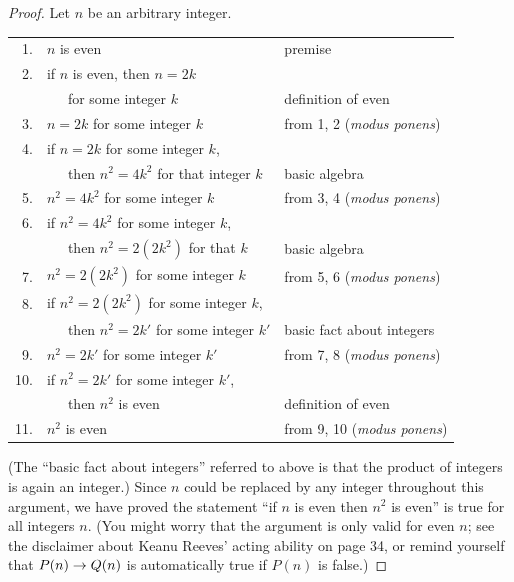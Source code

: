 \begin{proof}
Let $n$ 
be an arbitrary integer.
\begin{center}
\begin{tabular}{r@{\ \ }l@{\qquad}l}
1.&$n$ is even                                      &  premise\\
2.&if $n$ is even, then $n=2k$                      & \\
  & \ \ \ for some integer $k$                      & definition of even \\
3.&$n=2k$ for some integer $k$                      & from 1, 2 (\textit{modus ponens})\\
4.&if $n=2k$ for some integer $k$,                  & \\
  & \ \ \  then $n^2=4k^2$ for that integer $k$     & basic algebra\\
5.&$n^2 = 4k^2$ for some integer $k$                & from 3, 4 (\textit{modus ponens})\\
6.&if $n^2=4k^2$ for some integer $k$,              & \\
  & \ \ \  then $n^2=2(2k^2)$ for that $k$          & basic algebra\\
7.&$n^2=2(2k^2)$ for some integer $k$               & from 5, 6 (\textit{modus ponens})\\
8.&if $n^2 = 2(2k^2)$ for some integer $k$,         & \\
  & \ \ \  then $n^2 = 2k'$ for some integer $k'$   & basic fact about integers\\
9.&$n^2 = 2k'$ for some integer $k'$                & from 7, 8 (\textit{modus ponens})\\
10.&if $n^2 = 2k'$ for some integer $k'$,           & \\
  & \ \ \ then $n^2$ is even                        & definition of even\\
11.&$n^2$ is even                                   & from 9, 10 (\textit{modus ponens})\\
\end{tabular}
\end{center}
(The ``basic fact about integers'' referred to above is that the product of
integers is again an integer.)
Since $n$ could be replaced by any integer throughout this argument, we have proved
the statement ``if $n$ is even then $n^2$
is even'' is true for all integers $n$. (You might worry that the argument is only
valid for even $n$; see the disclaimer about Keanu Reeves' acting ability on 
page 34, or remind yourself that $P(n) \rightarrow Q(n)$ is automatically true if
$P(n)$ is false.)
\end{proof}

